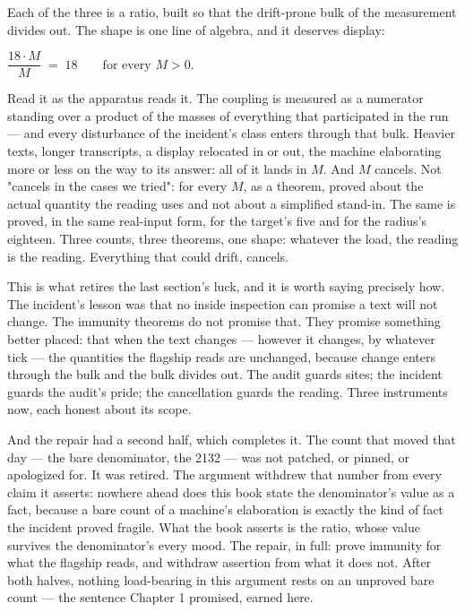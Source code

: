 Each of the three is a ratio, built so that the drift-prone bulk of the measurement
divides out. The shape is one line of algebra, and it deserves display:

\begin{center}
$\dfrac{18 \cdot M}{M} \;=\; 18 \qquad \text{for every } M > 0.$
\end{center}

Read it as the apparatus reads it. The coupling is measured as a numerator standing
over a product of the masses of everything that participated in the run --- and every
disturbance of the incident's class enters through that bulk. Heavier texts, longer
transcripts, a display relocated in or out, the machine elaborating more or less on the
way to its answer: all of it lands in $M$. And $M$ cancels. Not "cancels in the cases
we tried": for every $M$, as a theorem, proved about the actual quantity the reading
uses and not about a simplified stand-in. The same is proved, in the same real-input
form, for the target's five and for the radius's eighteen. Three counts, three
theorems, one shape: whatever the load, the reading is the reading. Everything that
could drift, cancels.

This is what retires the last section's luck, and it is worth saying precisely how.
The incident's lesson was that no inside inspection can promise a text will not
change. The immunity theorems do not promise that. They promise something better
placed: that when the text changes --- however it changes, by whatever tick --- the
quantities the flagship reads are unchanged, because change enters through the bulk
and the bulk divides out. The audit guards sites; the incident guards the audit's
pride; the cancellation guards the reading. Three instruments now, each honest about
its scope.

And the repair had a second half, which completes it. The count that moved that day
--- the bare denominator, the 2132 --- was not patched, or pinned, or apologized for.
It was retired. The argument withdrew that number from every claim it asserts: nowhere
ahead does this book state the denominator's value as a fact, because a bare count of
a machine's elaboration is exactly the kind of fact the incident proved fragile. What
the book asserts is the ratio, whose value survives the denominator's every mood. The
repair, in full: prove immunity for what the flagship reads, and withdraw assertion
from what it does not. After both halves, nothing load-bearing in this argument rests
on an unproved bare count --- the sentence Chapter 1 promised, earned here.

